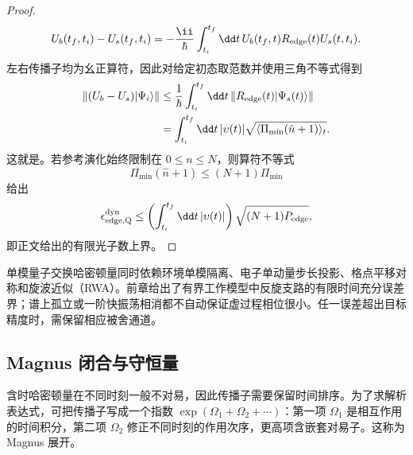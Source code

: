 \begin{proof}
\begin{equation*}
U_b(t_f,t_i)-U_s(t_f,t_i)
=-\frac{\ii}{\hbar}
\int_{t_i}^{t_f}\dd t\,
U_b(t_f,t)R_{\rm edge}(t)U_s(t,t_i).
\end{equation*}
左右传播子均为幺正算符，因此对给定初态取范数并使用三角不等式得到
\begin{align*}
\|(U_b-U_s)|\Psi_i\rangle\|
&\le
\frac1\hbar\int_{t_i}^{t_f}\dd t\,
\|R_{\rm edge}(t)|\Psi_s(t)\rangle\|\\
&=
\int_{t_i}^{t_f}\dd t\,|\upsilon(t)|
\sqrt{\langle\Pi_{\min}(\hat n+1)\rangle_t}.
\end{align*}
这就是。若参考演化始终限制在 $0\le n\le N$，则算符不等式
\begin{equation*}
\Pi_{\min}(\hat n+1)
\le (N+1)\Pi_{\min}
\end{equation*}
给出
\begin{equation*}
\epsilon_{\rm edge,Q}^{\rm dyn}
\le
\left(\int_{t_i}^{t_f}\dd t\,|\upsilon(t)|\right)
\sqrt{(N+1)P_{\rm edge}},
\end{equation*}
即正文给出的有限光子数上界。
\end{proof}


单模量子交换哈密顿量同时依赖环境单模隔离、电子单动量步长投影、格点平移对称和旋波近似（RWA）。前章给出了有界工作模型中反旋支路的有限时间充分误差界；谱上孤立或一阶快振荡相消都不自动保证虚过程相位很小。任一误差超出目标精度时，需保留相应被舍通道。

\subsection{Magnus 闭合与守恒量}

含时哈密顿量在不同时刻一般不对易，因此传播子需要保留时间排序。为了求解析表达式，可把传播子写成一个指数 $\exp(\Omega_1+\Omega_2+\cdots)$：第一项 $\Omega_1$ 是相互作用的时间积分，第二项 $\Omega_2$ 修正不同时刻的作用次序，更高项含嵌套对易子。这称为 Magnus 展开。

